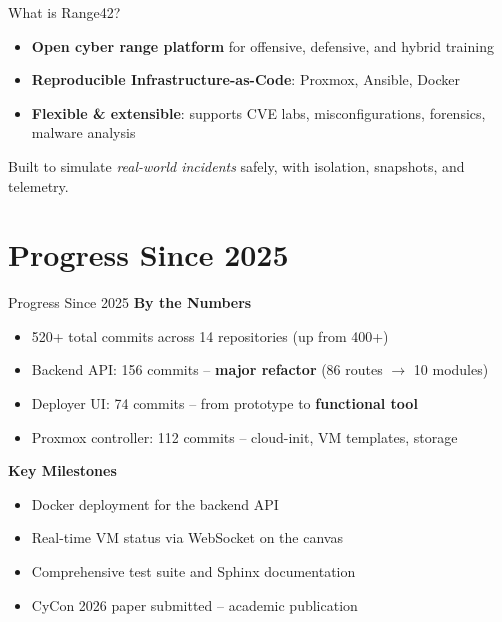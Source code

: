 \documentclass[aspectratio=169]{beamer}
\begin{document}
\begin{frame}{What is Range42?}
  \begin{itemize}
    \item \textbf{Open cyber range platform} for offensive, defensive, and hybrid training
    \item \textbf{Reproducible Infrastructure-as-Code}: Proxmox, Ansible, Docker
    \item \textbf{Flexible \& extensible}: supports CVE labs, misconfigurations, forensics, malware analysis
  \end{itemize}
  \begin{tcolorbox}
    \faInfoCircle\; Built to simulate \emph{real-world incidents} safely, with isolation, snapshots, and telemetry.
  \end{tcolorbox}
\end{frame}

\section{Progress Since 2025}

\begin{frame}{Progress Since 2025 \; \faChartLine}
  \textbf{By the Numbers}
  \begin{itemize}
    \item \alert{520+ total commits} across 14 repositories (up from 400+)
    \item Backend API: 156 commits -- \textbf{major refactor} (86 routes $\rightarrow$ 10 modules)
    \item Deployer UI: 74 commits -- from prototype to \textbf{functional tool}
    \item Proxmox controller: 112 commits -- cloud-init, VM templates, storage
  \end{itemize}
  \vspace{1mm}
  \textbf{Key Milestones}
  \begin{itemize}
    \item \alert{Docker deployment} for the backend API
    \item \alert{Real-time VM status} via WebSocket on the canvas
    \item \alert{Comprehensive test suite} and Sphinx documentation
    \item \alert{CyCon 2026 paper submitted} -- academic publication
  \end{itemize}
\end{frame}
\end{document}
